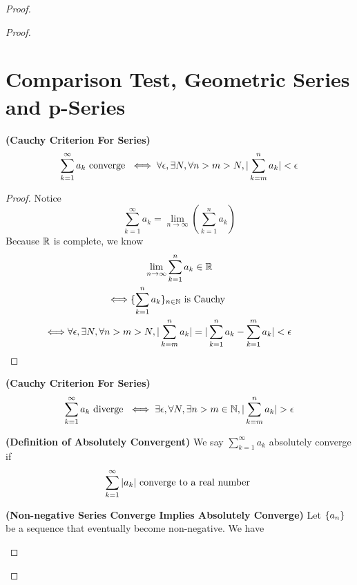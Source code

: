 \documentclass{report}
\begin{document}
\begin{proof}
\begin{proof}
\section{Comparison Test, Geometric Series and p-Series}
\begin{theorem}
\label{4.2.1}
\textbf{(Cauchy Criterion For Series)} 
\begin{equation}
  \sum_{k=1}^\infty a_k\text{ converge }\iff \forall \epsilon , \exists N, \forall n>m>N, |\sum_{k=m}^n a_k|<\epsilon   
\end{equation}
\end{theorem}
\begin{proof}
Notice 
\begin{equation}
\sum_{k=1}^\infty a_k=\lim_{n\to\infty} (\sum_{k=1}^n a_k)
\end{equation}
Because $\mathbb{R}$ is complete, we know  
 \begin{gather}
\lim_{n\to\infty}\sum_{k=1}^n a_k\inr\\
\liff \set{\sum_{k=1}^n a_k}_{n\inn}\text{ is Cauchy }\\
\liff \forall \epsilon ,\exists N,\forall n>m>N, \abso{\sum_{k=m}^n a_k}=\abso{\sum_{k=1}^n a_k- \sum_{k=1}^m a_k}<\epsilon 
\end{gather}
\end{proof}
\begin{corollary}
\label{4.2.2}
\textbf{(Cauchy Criterion For Series)} 
\begin{equation}
  \sum_{k=1}^\infty a_k\text{ diverge }\iff \exists \epsilon, \forall N, \exists  n>m \inn, \abso{\sum_{k=m}^n a_k}>\epsilon 
\end{equation}
\end{corollary}
\begin{definition}
\label{4.2.3}
\textbf{(Definition of Absolutely Convergent)} We say $\sum_{k=1}^\infty a_k$ absolutely converge if 
\begin{equation}
 \sum_{k=1}^\infty |a_k| \text{ converge to a real number }
\end{equation}
\end{definition}
\begin{theorem}
\label{4.2.4}
\textbf{(Non-negative Series Converge Implies Absolutely Converge)} Let $\{ a_n \}$ be a sequence that eventually become non-negative. We have

\end{theorem}
\end{proof}
\end{proof}
\end{document}
